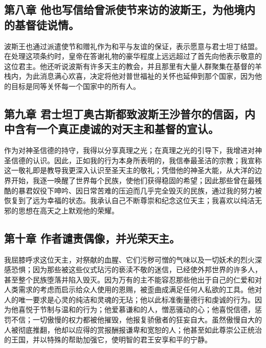 
\subsection{第八章 他也写信给曾派使节来访的波斯王，为他境内的基督徒说情。}

波斯王也通过派遣使节和赠礼作为和平与友谊的保证，表示愿意与君士坦丁结盟。在处理这项条约时，皇帝在答谢礼物的豪华程度上远远超过了首先向他表示敬意的这位君主。他还听说波斯有许多天主的教会，并且那里有大量人群聚集在基督的羊栈内，为此消息满心欢喜，决定将他对普世福祉的关怀也延伸到那个国家，因为他的目标是同等关怀每一个国家中的所有人。\par


\subsection{第九章 君士坦丁奥古斯都致波斯王沙普尔的信函，内中含有一个真正虔诚的对天主和基督的宣认。}

\par

作为对神圣信德的持守，我得以分享真理之光；在真理之光的引导下，我增进对神圣信德的认识。因此，正如我的行为本身所表明的，我信奉最圣洁的宗教；我宣称这一敬礼即是教导我更深入认识至圣天主的敬礼；凭借他的神圣大能，从大洋的边界开始，我逐一唤醒了世界每个民族，使他们获得稳固的希望；因此那些曾在最残酷的暴君奴役下呻吟、因日常苦难的压迫而几乎完全毁灭的民族，通过我的努力被恢复到了远为幸福的状态。我承认自己不断尊崇和纪念这位天主；我喜欢以纯洁无邪的思想在高天之上默观他的荣耀。\par


\subsection{第十章 作者谴责偶像，并光荣天主。}

我屈膝呼求这位天主，对祭献的血腥、它们污秽可憎的气味以及一切妖术的烈火深感恐惧；因为那些被这些仪式玷污的亵渎不敬的迷信，已经使外邦世界的许多人，甚至整个民族堕落并陷入毁灭。因为万有的主不能容忍那些他出于自己的仁爱和对人类需求的考虑而启示给众人使用的恩赐，被歪曲成满足任何人私欲的工具。他对人的唯一要求是心灵的纯洁和灵魂的无玷；他以此标准衡量德行和虔诚的行为。因为他喜悦于节制与温和的行为；他爱慕谦和的人，憎恶骚动的心；他喜悦信德，惩罚不信；一切傲慢的权力都被他摧毁，他报复骄傲者的狂妄自大。虽然傲慢自大的人被彻底推翻，他却以应得的赏报酬报谦卑和宽恕的人；他甚至如此尊崇公正统治的王国，并以特殊的帮助加强它，使明智的君王安享和平的宁静。\par

